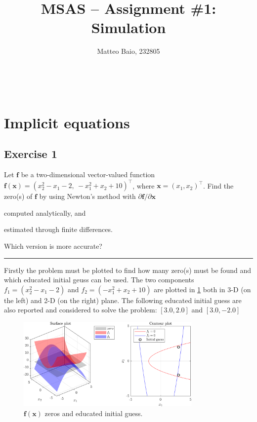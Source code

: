 \documentclass[11pt,a4paper,oneside]{article}
\title{MSAS -- Assignment \#1: Simulation}  %
\author{\large Matteo Baio, 232805}
\date{}
\makeatletter
\renewcommand{\vec}[1]{\mathbf{#1}}
\newcommand\headlinecolor{\normalcolor}
\renewcommand*\maketitle{
    \begingroup
    \centering
    \fontsize{14.4}{14.4}       %
    \selectfont
    \headlinecolor
    \@title\\
    \vspace{5mm}
    \@author
    \par
    \vskip1in
    \endgroup
    \vspace{-22mm}
}
\makeatother
\begin{document}
\maketitle
\thispagestyle{fancy}

\section{Implicit equations}
\subsection{Exercise 1}
Let $\vec{f}$ be a two-dimensional vector-valued function $\vec{f}(\vec{x}) = (x_2^2-x_1-2, \ -x_1^2+x_2+10)^\top$,
where $\vec{x} = (x_1, x_2)^\top$. Find the zero(s) of $\vec{f}$ by using Newton's method with $\partial\vec f/\partial\vec x$ 
\begin{enumerate*}[label=\arabic*)]
    \item computed analytically, and
    \item estimated through finite differences.
\end{enumerate*}
Which version is more accurate?

\medskip
\hrule
\medskip

Firstly the problem must be plotted to find how many zero(s) must be found and which educated initial geuss can be used.
The two components $f_1=(x_2^2-x_1-2)$ and $f_2=(-x_1^2+x_2+10)$ are plotted in \cref{fig:ex1_initGuess} both in 3-D (on the left) and 2-D (on the right) plane.
The following educated initial guess are also reported and considered to solve the problem: $[3.0,2.0]$ and $[3.0,-2.0]$

\begin{figure}[htb]
    \centering
    \includegraphics*[width=0.8\textwidth, keepaspectratio]{ex1_initGuess.png}
    \caption[]{\label{fig:ex1_initGuess} $\vec{f}(\vec{x})$ zeros and educated initial guess.}
\end{figure}
\end{document}

